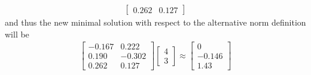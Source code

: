 \begin{Answer}
\begin{align*}
\begin{bmatrix}
0.262 & 0.127
\end{bmatrix}
\end{align*}
and thus the new minimal solution with respect to the alternative norm definition will be
\begin{align*}
\begin{bmatrix}
-0.167 & 0.222 \\
0.190 & -0.302 \\
0.262 & 0.127
\end{bmatrix}   
\begin{bmatrix}
4 \\
3
\end{bmatrix}
\approx
\begin{bmatrix}
0 \\
-0.146 \\
1.43
\end{bmatrix}
\end{align*}
\end{Answer}